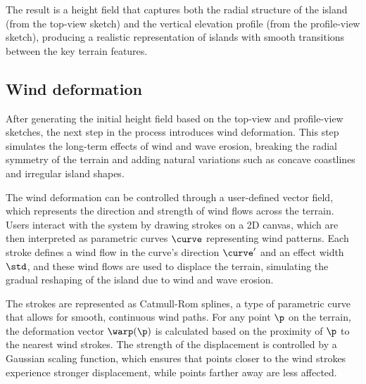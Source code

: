 
The result is a height field that captures both the radial structure of the island (from the top-view sketch) and the vertical elevation profile (from the profile-view sketch), producing a realistic representation of islands with smooth transitions between the key terrain features.



\subsection{Wind deformation}

After generating the initial height field based on the top-view and profile-view sketches, the next step in the process introduces wind deformation. This step simulates the long-term effects of wind and wave erosion, breaking the radial symmetry of the terrain and adding natural variations such as concave coastlines and irregular island shapes.


The wind deformation can be controlled through a user-defined vector field, which represents the direction and strength of wind flows across the terrain. Users interact with the system by drawing strokes on a 2D canvas, which are then interpreted as parametric curves $\curve$ representing wind patterns. Each stroke defines a wind flow in the curve's direction $\curve'$ and an effect width $\std$, and these wind flows are used to displace the terrain, simulating the gradual reshaping of the island due to wind and wave erosion.

The strokes are represented as Catmull-Rom splines, a type of parametric curve that allows for smooth, continuous wind paths. For any point $\p$ on the terrain, the deformation vector $\warp(\p)$ is calculated based on the proximity of $\p$ to the nearest wind strokes. The strength of the displacement is controlled by a Gaussian scaling function, which ensures that points closer to the wind strokes experience stronger displacement, while points farther away are less affected.

